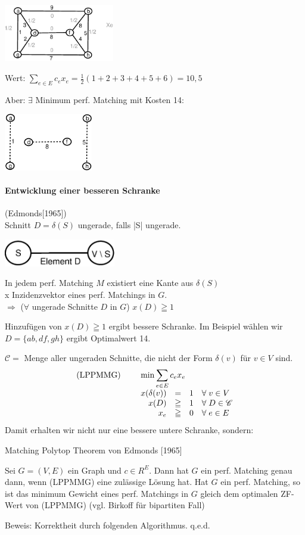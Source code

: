 \includegraphics[height=2.5cm]{bilder/5-3Allg1}

Wert: $\displaystyle \sum_{e\in E} c_e x_e = \frac{1}{2}(1+2+3+4+5+6) =
10,5$

Aber: $\exists$ Minimum perf. Matching mit Kosten 14:

\includegraphics[height=2.5cm]{bilder/5-3Allg2}

\paragraph{Entwicklung einer besseren Schranke} (Edmonds[1965])\\
Schnitt $D= \delta(S)$ ungerade, falls |S| ungerade.

\includegraphics[height=1.2cm]{bilder/5-3Allg3}
 
In jedem perf. Matching $M$ existiert eine Kante aus $\delta(S)$\\
x Inzidenzvektor eines perf. Matchings in $G$.\\
$\Rightarrow$ ($\forall$ ungerade Schnitte $D$ in $G$) $x(D) \geqq 1$ 

Hinzufügen von $x(D) \geqq 1$ ergibt bessere Schranke. Im Beispiel wählen
wir $D=\{a b, d f, g h\}$ ergibt Optimalwert 14.

$\mathscr{C} =$ Menge aller ungeraden Schnitte, die nicht der Form
$\delta(v)$ für $v \in V$ sind.
\[\begin{array}{lrcll}
\mbox{(LPPMMG)} \hspace{5mm}&\multicolumn{4}{l}{\min \displaystyle \sum_{e \in E} c_e
x_e}\\
&x(\delta(v)) &=&1&\forall \; v \in V\\
&x(D) &\geqq&1&\forall \; D \in \mathscr{C} \\
&x_e&\geqq& 0&\forall \; e \in E
\end{array}
\]
Damit erhalten wir nicht nur eine bessere untere Schranke, sondern:
\begin{satz} \label{MatPolyEdmonds}
Matching Polytop Theorem von Edmonds [1965]

Sei $G=(V,E)$ ein Graph und $c \in R^E$. Dann hat $G$ ein perf. Matching
genau dann, wenn (LPPMMG) eine zulässige Lösung hat. Hat $G$ ein perf. Matching,
so ist das minimum Gewicht eines perf. Matchings in $G$ gleich dem
optimalen ZF-Wert von (LPPMMG) (vgl. Birkoff für bipartiten Fall)
\end{satz}
Beweis: Korrektheit durch folgenden Algorithmus. q.e.d.

